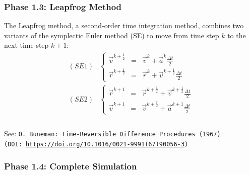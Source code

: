 \begin{frame}[fragile]
  \frametitle{Phase 1.3: Leapfrog Method}
  The Leapfrog method, a second-order time integration method, combines two variants of the symplectic Euler method (SE) to move from time step $k$ to the next time step $k + 1$:
  \begin{equation*}
    \begin{split}
      (SE1) &\left\lbrace
      \begin{array}{rcl}
        \vec{v}^{k+\frac{1}{2}} & = & \vec{v}^k + \vec{a}^k \frac{\Delta t}{2}               \\
        \vec{r}^{k+\frac{1}{2}} & = & \vec{r}^k + \vec{v}^{k + \frac{1}{2}} \frac{\Delta t}{2}
      \end{array}\right.\\[.5em]
      (SE2) &\left\lbrace
      \begin{array}{rcl}
        \vec{r}^{k+1} & = & \vec{r}^{k + \frac{1}{2}} + \vec{v}^{k + \frac{1}{2}} \frac{\Delta t}{2} \\
        \vec{v}^{k+1} & = & \vec{v}^{k + \frac{1}{2}} + \vec{a}^{k+1} \frac{\Delta t}{2}
      \end{array}\right.\\
    \end{split}
  \end{equation*} \\
  \vfill
  \setfontsize{8pt}
  See: \texttt{O. Buneman: Time-Reversible Difference Procedures (1967)\\[-.5em]
  (DOI: \url{https://doi.org/10.1016/0021-9991(67)90056-3})}
\end{frame}

\begin{frame}[fragile]
  \frametitle{Phase 1.4: Complete Simulation}
\begin{algorithmcl}
    \begin{algorithmic}[1]
            \EndIf
        \EndWhile
    \end{algorithmic}
\end{algorithmcl}
\end{frame}

